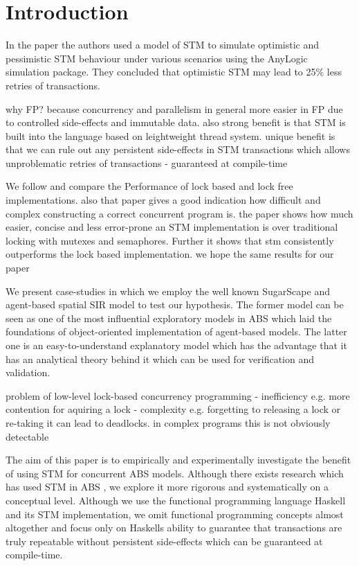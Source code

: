 \section{Introduction}

In the paper \cite{heindl_modeling_2009} the authors used a model of STM to simulate optimistic and pessimistic STM behaviour under various scenarios using the AnyLogic simulation package. They concluded that optimistic STM may lead to 25\% less retries of transactions.

why FP? because concurrency and parallelism in general more easier in FP due to controlled side-effects and immutable data. also strong benefit is that STM is built into the language based on leightweight thread system. unique benefit is that we can rule out any persistent side-effects in STM transactions which allows unproblematic retries of transactions - guaranteed at compile-time

We follow \cite{discolo_lock_2006} and compare the Performance of lock based and lock free implementations. also that paper gives a good indication how difficult and complex constructing a correct concurrent program is. the paper shows how much easier, concise and less error-prone an STM implementation is over traditional locking with mutexes and semaphores. Further it shows that stm consistently outperforms the lock based implementation. we hope the same results for our paper

We present case-studies in which we employ the well known SugarScape \citep{epstein_growing_1996} and agent-based spatial SIR \citep{macal_agent-based_2010} model to test our hypothesis. The former model can be seen as one of the most influential exploratory models in ABS which laid the foundations of object-oriented implementation of agent-based models. The latter one is an easy-to-understand explanatory model which has the advantage that it has an analytical theory behind it which can be used for verification and validation. 

problem of low-level lock-based concurrency programming
- inefficiency e.g. more contention for aquiring a lock
- complexity e.g. forgetting to releasing a lock or re-taking it can lead to deadlocks. in complex programs this is not obviously detectable

The aim of this paper is to empirically and experimentally investigate the benefit of using STM for concurrent ABS models. Although there exists research which has used STM in ABS \cite{bezirgiannis_improving_2013}, we explore it more rigorous and systematically on a conceptual level. Although we use the functional programming language Haskell and its STM implementation, we omit functional programming concepts almost altogether and focus only on Haskells ability to guarantee that transactions are truly repeatable without persistent side-effects which can be guaranteed at compile-time.

